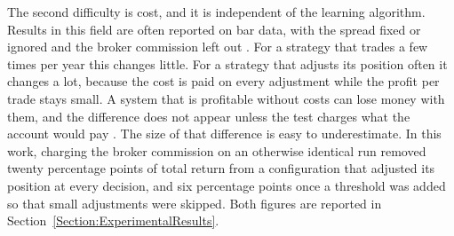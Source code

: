 The second difficulty is cost, and it is independent of the learning algorithm. Results in this field are often reported on bar data, with the spread fixed or ignored and the broker commission left out \cite{fischer_reinforcement_2018, pricope_deep_2021}. For a strategy that trades a few times per year this changes little. For a strategy that adjusts its position often it changes a lot, because the cost is paid on every adjustment while the profit per trade stays small. A system that is profitable without costs can lose money with them, and the difference does not appear unless the test charges what the account would pay \cite{lopez_de_prado_advances_2018}. The size of that difference is easy to underestimate. In this work, charging the broker commission on an otherwise identical run removed twenty percentage points of total return from a configuration that adjusted its position at every decision, and six percentage points once a threshold was added so that small adjustments were skipped. Both figures are reported in Section~\ref{Section:ExperimentalResults}.